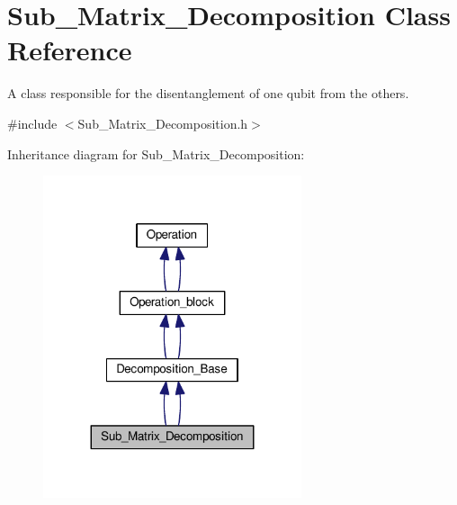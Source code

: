 \hypertarget{class_sub___matrix___decomposition}{}\section{Sub\+\_\+\+Matrix\+\_\+\+Decomposition Class Reference}
\label{class_sub___matrix___decomposition}


A class responsible for the disentanglement of one qubit from the others.  




{\ttfamily \#include $<$Sub\+\_\+\+Matrix\+\_\+\+Decomposition.\+h$>$}



Inheritance diagram for Sub\+\_\+\+Matrix\+\_\+\+Decomposition\+:
\nopagebreak
\begin{figure}[H]
\begin{center}
\leavevmode
\includegraphics[width=215pt]{class_sub___matrix___decomposition__inherit__graph}
\end{center}
\end{figure}
